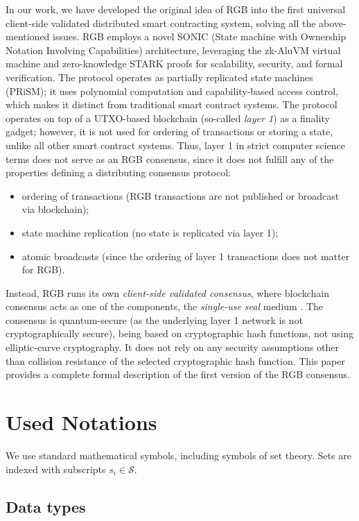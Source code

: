 \documentclass[9pt,oneside]{amsart}
\begin{document}
\begin{multicols}{2}
In our work, we have developed the original idea of RGB into the first universal
client-side validated distributed smart contracting system,
solving all the above-mentioned issues.
RGB employs a novel SONIC (State machine with Ownership Notation Involving Capabilities) architecture,
leveraging the zk-AluVM virtual machine and zero-knowledge STARK proofs
for scalability, security, and formal verification.
The protocol operates as partially replicated state machines (PRiSM);
it uses polynomial computation and capability-based access control,
which makes it distinct from traditional smart contract systems.
The protocol operates on top of a UTXO-based blockchain (so-called \emph{layer 1})
as a finality gadget; however, it is not used for ordering of transactions or storing a state,
unlike all other smart contract systems.
Thus, layer 1 in strict computer science terms does not serve as an RGB consensus,
since it does not fulfill any of the properties defining a distributing consensus protocol:

\begin{itemize}
    \item ordering of transactions (RGB transactions are not published or broadcast via blockchain);
    \item state machine replication (no state is replicated via layer 1);
    \item atomic broadcasts (since the ordering of layer 1 transactions does not matter for RGB).
\end{itemize}

Instead, RGB runs its own \emph{client-side validated consensus}, where blockchain consensus
acts as one of the components, the \emph{single-use seal} medium \cite{LNPBP8}.
The consensus is quantum-secure (as the underlying layer 1 network is not cryptographically secure),
being based on cryptographic hash functions, not using elliptic-curve cryptography.
It does not rely on any security assumptions other than collision resistance of the selected
cryptographic hash function.
This paper provides a complete formal description of the first version of the RGB consensus.

\section{Used Notations}

We use standard mathematical symbols, including symbols of set theory.
Sets are indexed with subscripts $s_i \in \mathcal{S}$.

\subsection{Data types}


\end{multicols}
\end{document}
